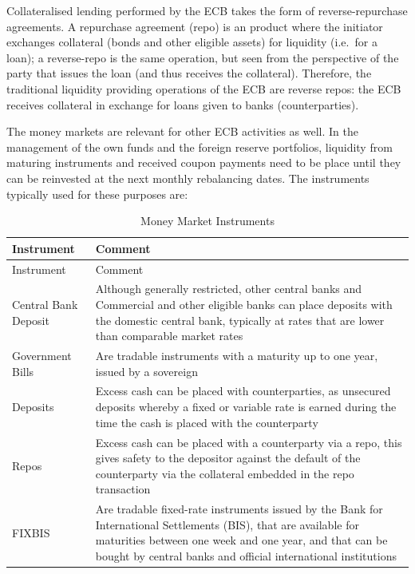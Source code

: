 \documentclass[
  letterpaper,
  DIV=11,
  numbers=noendperiod]{scrreprt}
\begin{document}
Collateralised lending performed by the ECB takes the form of
reverse-repurchase agreements. A repurchase agreement (repo) is an
product where the initiator exchanges collateral (bonds and other
eligible assets) for liquidity (i.e.~for a loan); a reverse-repo is the
same operation, but seen from the perspective of the party that issues
the loan (and thus receives the collateral). Therefore, the traditional
liquidity providing operations of the ECB are reverse repos: the ECB
receives collateral in exchange for loans given to banks
(counterparties).

The money markets are relevant for other ECB activities as well. In the
management of the own funds and the foreign reserve portfolios,
liquidity from maturing instruments and received coupon payments need to
be place until they can be reinvested at the next monthly rebalancing
dates. The instruments typically used for these purposes are:

\protect{}\label{tab:MoneyMarketInstruments}
\begin{longtable}[]{@{}ll@{}}
\caption{Money Market Instruments}\tabularnewline
\toprule\noalign{}
Instrument & Comment \\
\midrule\noalign{}
\endfirsthead
\toprule\noalign{}
Instrument & Comment \\
\midrule\noalign{}
\endhead
\bottomrule\noalign{}
\endlastfoot
Central Bank Deposit & Although generally restricted, other central
banks and Commercial and other eligible banks can place deposits with
the domestic central bank, typically at rates that are lower than
comparable market rates \\
Government Bills & Are tradable instruments with a maturity up to one
year, issued by a sovereign \\
Deposits & Excess cash can be placed with counterparties, as unsecured
deposits whereby a fixed or variable rate is earned during the time the
cash is placed with the counterparty \\
Repos & Excess cash can be placed with a counterparty via a repo, this
gives safety to the depositor against the default of the counterparty
via the collateral embedded in the repo transaction \\
FIXBIS & Are tradable fixed-rate instruments issued by the Bank for
International Settlements (BIS), that are available for maturities
between one week and one year, and that can be bought by central banks
and official international institutions \\
\end{longtable}
\end{document}
